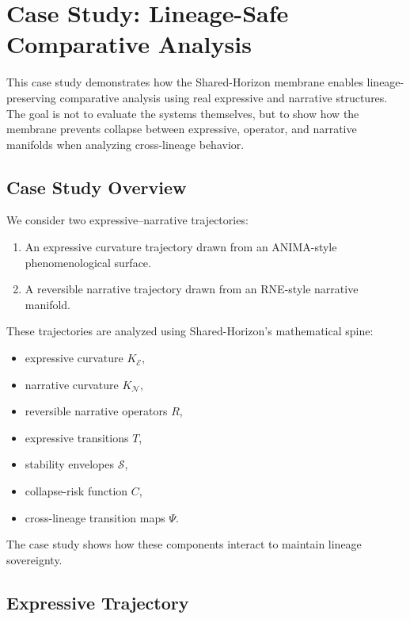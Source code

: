 
\section{Case Study: Lineage-Safe Comparative Analysis}
\label{sec:case-study}

This case study demonstrates how the Shared-Horizon membrane enables
lineage-preserving comparative analysis using real expressive and narrative
structures. The goal is not to evaluate the systems themselves, but to show how
the membrane prevents collapse between expressive, operator, and narrative
manifolds when analyzing cross-lineage behavior.

\subsection{Case Study Overview}

We consider two expressive–narrative trajectories:

\begin{enumerate}
    \item An expressive curvature trajectory drawn from an ANIMA-style
    phenomenological surface.

    \item A reversible narrative trajectory drawn from an RNE-style narrative
    manifold.
\end{enumerate}

These trajectories are analyzed using Shared-Horizon’s mathematical spine:

\begin{itemize}
    \item expressive curvature $K_{\mathcal{E}}$,
    \item narrative curvature $K_{\mathcal{N}}$,
    \item reversible narrative operators $R$,
    \item expressive transitions $T$,
    \item stability envelopes $\mathcal{S}$,
    \item collapse-risk function $C$,
    \item cross-lineage transition maps $\Psi$.
\end{itemize}

The case study shows how these components interact to maintain lineage
sovereignty.

\subsection{Expressive Trajectory}


